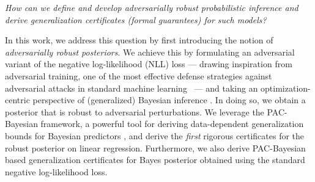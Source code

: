 \begin{comment}
Despite extensive studies on adversarial robustness in deterministic machine learning models, probabilistic models—particularly those based on Bayesian inference—remain underexplored \citep{bradshaw2017adversarial, grosse2018limitations}. Bayesian methods offer inherent uncertainty quantification, which is often seen as a desirable property for robustness as it enables detecting the adversarial inputs and rejecting uncertain predictions. However, while Bayesian models have been studied in contexts such as outlier detection \citep{kim2008outlier}, label noise \citep{hernandez2011robust}, and domain adaptation, their susceptibility to adversarial attacks remains largely unexamined. 
In particular, there exists no well-defined notion of adversarially robust Bayesian inference, therefore, no formal generalization guarantees for such a robust Bayesian model,
thus raising a fundamental question:
\end{comment}

\emph{How can we define and develop adversarially robust probabilistic inference and derive generalization certificates (formal guarantees) for such models?}

In this work, we address this question by first introducing the notion of \emph{adversarially robust posteriors}. 
We achieve this by formulating an adversarial variant of the negative log-likelihood (NLL) loss --- drawing inspiration from adversarial training, one of the most effective defense strategies against adversarial attacks in standard machine learning~\citep{madry2018towards} --- and taking an optimization-centric perspective of (generalized) Bayesian inference \citep{alquier2016properties}.
In doing so, we obtain a posterior that is robust to adversarial perturbations.
We leverage the PAC-Bayesian framework, a powerful tool for deriving data-dependent generalization bounds for Bayesian predictors %
\citep{mcallester1998some,catoni2004statistical}, and derive the \emph{first} rigorous certificates for the robust posterior on linear regression.
Furthermore, we also derive PAC-Bayesian based generalization certificates for Bayes posterior obtained using the standard negative log-likelihood loss.

